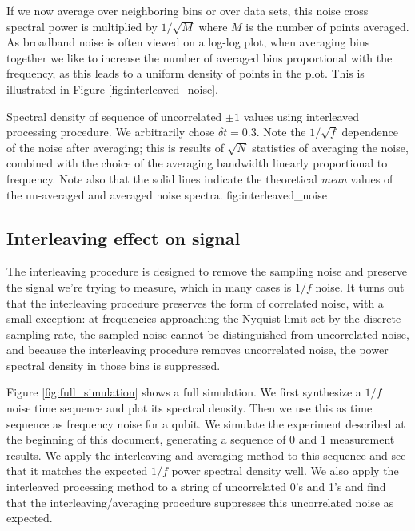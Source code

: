 \documentclass[twocolumn]{article}
\begin{document}
If we now average over neighboring bins or over data sets, this noise cross spectral power is multiplied by $1/\sqrt{M}$ where $M$ is the number of points averaged.
As broadband noise is often viewed on a log-log plot, when averaging bins together we like to increase the number of averaged bins proportional with the frequency, as this leads to a uniform density of points in the plot.
This is illustrated in Figure \ref{fig:interleaved_noise}.

{Spectral density of sequence of uncorrelated $\pm 1$ values using interleaved processing procedure.
We arbitrarily chose $\delta t = 0.3$.
Note the $1/\sqrt{f}$ dependence of the noise after averaging; this is results of $\sqrt{N}$ statistics of averaging the noise, combined with the choice of the averaging bandwidth linearly proportional to frequency.
Note also that the solid lines indicate the theoretical \emph{mean} values of the un-averaged and averaged noise spectra.}
{fig:interleaved_noise}

\subsection{Interleaving effect on signal}

The interleaving procedure is designed to remove the sampling noise and preserve the signal we're trying to measure, which in many cases is $1/f$ noise.
It turns out that the interleaving procedure preserves the form of correlated noise, with a small exception: at frequencies approaching the Nyquist limit set by the discrete sampling rate, the sampled noise cannot be distinguished from uncorrelated noise, and because the interleaving procedure removes uncorrelated noise, the power spectral density in those bins is suppressed.

Figure \ref{fig:full_simulation} shows a full simulation.
We first synthesize a $1/f$ noise time sequence and plot its spectral density.
Then we use this as time sequence as frequency noise for a qubit.
We simulate the experiment described at the beginning of this document, generating a sequence of 0 and 1 measurement results.
We apply the interleaving and averaging method to this sequence and see that it matches the expected $1/f$ power spectral density well.
We also apply the interleaved processing method to a string of uncorrelated 0's and 1's and find that the interleaving/averaging procedure suppresses this uncorrelated noise as expected.
\end{document}
